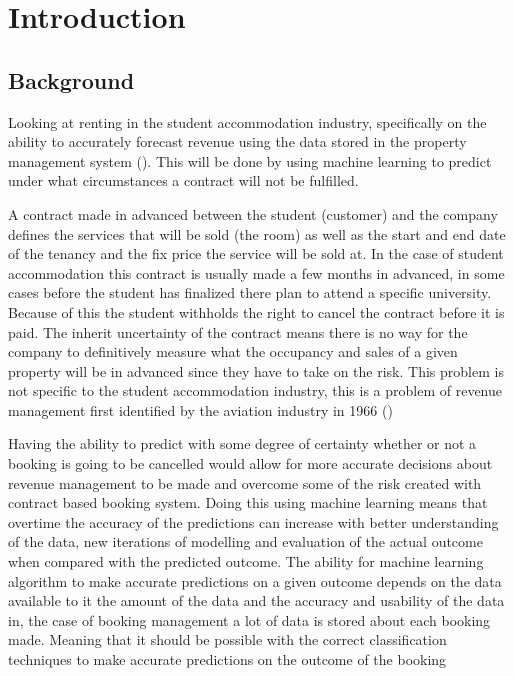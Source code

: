 \chapter{Introduction}

\section{Background}
Looking at renting in the student accommodation industry, specifically on the ability to accurately forecast revenue using the data stored in the property management system (\cite{Jain2006IntellectualPerspective}). This will be done by using machine learning to predict under what circumstances a contract will not be fulfilled.

\vspace{5mm}

A contract made in advanced between the student (customer) and the company defines the services that will be sold (the room) as well as the start and end date of the tenancy and the fix price the service will be sold at. In the case of student accommodation this contract is usually made a few months in advanced, in some cases before the student has finalized there plan to attend a specific university. Because of this the student withholds the right to cancel the contract before it is paid. The inherit uncertainty of the contract means there is no way for the company to definitively measure what the occupancy and sales of a given property will be in advanced since they have to take on the risk. This problem is not specific to the student accommodation industry, this is a problem of revenue management first identified by the aviation industry in 1966  (\cite{Chiang2007AnResearch})

\vspace{5mm}


Having the ability to predict with some degree of certainty whether or not a booking is going to be cancelled would allow for more accurate decisions about revenue management to be made and overcome some of the risk created with contract based booking system. Doing this using machine learning means that overtime the accuracy of the predictions can increase with better understanding of the data, new iterations of modelling and evaluation of the actual outcome when compared with the predicted outcome. The ability for machine learning algorithm to make accurate predictions on a given outcome depends on the data available to it the amount of the data and the accuracy and usability of the data in, the case of booking management a lot of data is stored about each booking made. Meaning that it should be possible with the correct classification techniques to make accurate predictions on the outcome of the booking



